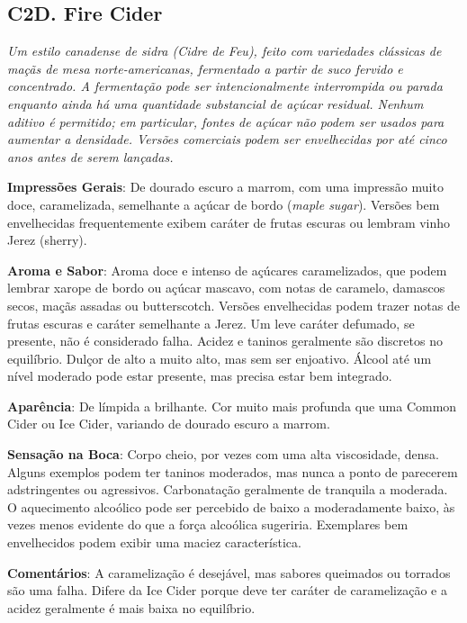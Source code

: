 \subsection*{C2D. Fire Cider}

\textit{Um estilo canadense de sidra (Cidre de Feu), feito com variedades clássicas de maçãs de mesa norte-americanas, fermentado a partir de suco fervido e concentrado. A fermentação pode ser intencionalmente interrompida ou parada enquanto ainda há uma quantidade substancial de açúcar residual. Nenhum aditivo é permitido; em particular, fontes de açúcar não podem ser usados para aumentar a densidade. Versões comerciais podem ser envelhecidas por até cinco anos antes de serem lançadas.}

\textbf{Impressões Gerais}: De dourado escuro a marrom, com uma impressão muito doce, caramelizada, semelhante a açúcar de bordo (\textit{maple sugar}). Versões bem envelhecidas frequentemente exibem caráter de frutas escuras ou lembram vinho Jerez (sherry).

\textbf{Aroma e Sabor}: Aroma doce e intenso de açúcares caramelizados, que podem lembrar xarope de bordo ou açúcar mascavo, com notas de caramelo, damascos secos, maçãs assadas ou butterscotch. Versões envelhecidas podem trazer notas de frutas escuras e caráter semelhante a Jerez. Um leve caráter defumado, se presente, não é considerado falha. Acidez e taninos geralmente são discretos no equilíbrio. Dulçor de alto a muito alto, mas sem ser enjoativo. Álcool até um nível moderado pode estar presente, mas precisa estar bem integrado. 

\textbf{Aparência}: De límpida a brilhante. Cor muito mais profunda que uma Common Cider ou Ice Cider, variando de dourado escuro a marrom.

\textbf{Sensação na Boca}: Corpo cheio, por vezes com uma alta viscosidade, densa. Alguns exemplos podem ter taninos moderados, mas nunca a ponto de parecerem adstringentes ou agressivos. Carbonatação geralmente de tranquila a moderada. O aquecimento alcoólico pode ser percebido de baixo a moderadamente baixo, às vezes menos evidente do que a força alcoólica sugeriria. Exemplares bem envelhecidos podem exibir uma maciez característica.

\textbf{Comentários}: A caramelização é desejável, mas sabores queimados ou torrados são uma falha. Difere da Ice Cider porque deve ter caráter de caramelização e a acidez geralmente é mais baixa no equilíbrio. 

